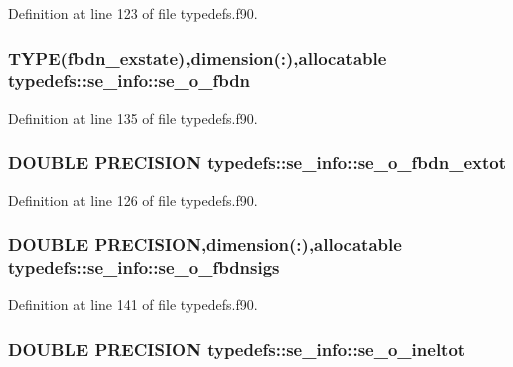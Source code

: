 Definition at line 123 of file typedefs.f90.\hypertarget{typetypedefs_1_1se__info_a5acf75a4e3c255609d5d7b6e079e2ef1}{
\subsubsection[{se\_\-o\_\-fbdn}]{\setlength{\rightskip}{0pt plus 5cm}TYPE({\bf fbdn\_\-exstate}),dimension(:),allocatable {\bf typedefs::se\_\-info::se\_\-o\_\-fbdn}}}
\label{typetypedefs_1_1se__info_a5acf75a4e3c255609d5d7b6e079e2ef1}


Definition at line 135 of file typedefs.f90.\hypertarget{typetypedefs_1_1se__info_a85c6182ccd3f9e49ece87ac7ec2d8e97}{
\subsubsection[{se\_\-o\_\-fbdn\_\-extot}]{\setlength{\rightskip}{0pt plus 5cm}DOUBLE PRECISION {\bf typedefs::se\_\-info::se\_\-o\_\-fbdn\_\-extot}}}
\label{typetypedefs_1_1se__info_a85c6182ccd3f9e49ece87ac7ec2d8e97}


Definition at line 126 of file typedefs.f90.\hypertarget{typetypedefs_1_1se__info_a12be38b49ef5d0878b370e8f15737e0f}{
\subsubsection[{se\_\-o\_\-fbdnsigs}]{\setlength{\rightskip}{0pt plus 5cm}DOUBLE PRECISION,dimension(:),allocatable {\bf typedefs::se\_\-info::se\_\-o\_\-fbdnsigs}}}
\label{typetypedefs_1_1se__info_a12be38b49ef5d0878b370e8f15737e0f}


Definition at line 141 of file typedefs.f90.\hypertarget{typetypedefs_1_1se__info_a44003d458c89fc0931faf433b0b6f50c}{
\subsubsection[{se\_\-o\_\-ineltot}]{\setlength{\rightskip}{0pt plus 5cm}DOUBLE PRECISION {\bf typedefs::se\_\-info::se\_\-o\_\-ineltot}}}
\label{typetypedefs_1_1se__info_a44003d458c89fc0931faf433b0b6f50c}


